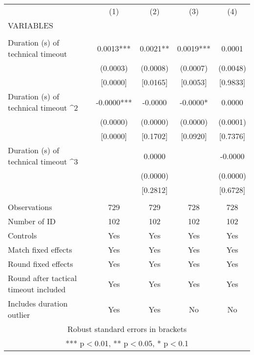 \documentclass[]{article}
\begin{document}
\begin{tabular}{lcccc} \hline
 & (1) & (2) & (3) & (4) \\
VARIABLES &  &  &  &  \\ \hline
 &  &  &  &  \\
Duration (s) of technical timeout & 0.0013*** & 0.0021** & 0.0019*** & 0.0001 \\
 & (0.0003) & (0.0008) & (0.0007) & (0.0048) \\
 & [0.0000] & [0.0165] & [0.0053] & [0.9833] \\
Duration (s) of technical timeout ^2 & -0.0000*** & -0.0000 & -0.0000* & 0.0000 \\
 & (0.0000) & (0.0000) & (0.0000) & (0.0001) \\
 & [0.0000] & [0.1702] & [0.0920] & [0.7376] \\
Duration (s) of technical timeout ^3 &  & 0.0000 &  & -0.0000 \\
 &  & (0.0000) &  & (0.0000) \\
 &  & [0.2812] &  & [0.6728] \\
 &  &  &  &  \\
Observations & 729 & 729 & 728 & 728 \\
Number of ID & 102 & 102 & 102 & 102 \\
Controls & Yes & Yes & Yes & Yes \\
Match fixed effects & Yes & Yes & Yes & Yes \\
Round fixed effects & Yes & Yes & Yes & Yes \\
Round after tactical timeout included & Yes & Yes & Yes & Yes \\
 Includes duration outlier & Yes & Yes & No & No \\ \hline
\multicolumn{5}{c}{ Robust standard errors in brackets} \\
\multicolumn{5}{c}{ *** p$<$0.01, ** p$<$0.05, * p$<$0.1} \\
\end{tabular}
\end{document}
